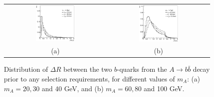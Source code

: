 \documentclass[preprintnumbers,superscriptaddress,nofootinbib,aps,prd,floatfix]{revtex4}
\begin{document}
\begin{figure}[htbp]
\begin{center}
\begin{tabular}{cc}
\includegraphics[width=0.4\textwidth]{Figures/DRbb.eps} &
\includegraphics[width=0.4\textwidth]{Figures/DRbb2.eps} \\
(a) & (b) \\
\end{tabular}
\caption{\small {Distribution of $\Delta R$ between the two $b$-quarks from the $A \to b\bar{b}$ decay prior to
any selection requirements, for different values of $m_A$: (a) $m_A=20, 30$ and  40 GeV, and (b) $m_A=60, 80$ and 100 GeV.}}
\label{fig:DRbb_ttA} 
\end{center}
\end{figure}
\end{document}
